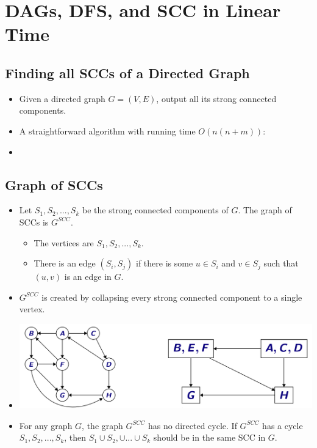 \section{DAGs, DFS, and SCC in Linear Time}

\subsection{Finding all SCCs of a Directed Graph}
\begin{itemize}
    \item Given a directed graph $G = (V, E)$, output all its strong connected components.
    \item A straightforward algorithm with running time $O(n(n + m))$:
    \item[] 
\end{itemize}

\subsection{Graph of SCCs}
\begin{itemize}
    \item Let $S_1, S_2, ..., S_k$ be the strong connected components of $G$. The graph of SCCs is $G^{SCC}$.
    \begin{itemize}
        \item The vertices are $S_1, S_2, ..., S_k$.
        \item There is an edge $(S_i, S_j)$ if there is some $u \in S_i$ and $v \in S_j$ such that $(u, v)$ is an edge in $G$.
    \end{itemize}
    \item $G^{SCC}$ is created by collapsing every strong connected component to a single vertex.
    \item[] \includegraphics[width=\textwidth]{lecture17/images/meta-graph.jpg}
    \item For any graph $G$, the graph $G^{SCC}$ has no directed cycle. If $G^{SCC}$ has a cycle $S_1, S_2, ..., S_k$, then $S_1 \cup S_2, \cup ... \cup S_k$ should be in the same SCC in $G$.
\end{itemize}

